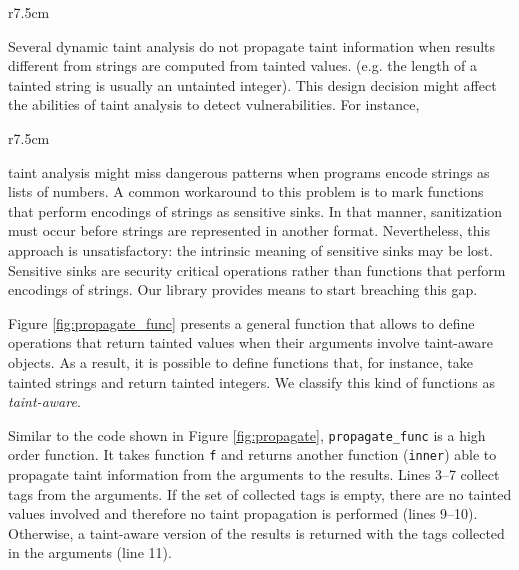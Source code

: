 \begin{wrapfigure}{r}{7.5cm}
\vspace{-30pt}
{\small{

\vspace{-5pt}
\caption{\label{fig:propagate_func} Propagation of taint information among
  possibly different taint-aware objects}
}}
\end{wrapfigure}
Several dynamic taint analysis
\cite{Perl,Nguyen05,Jovanovic06pixy:a,KozlovPetukhov07,Futo07,SeoLam2010}
do not propagate taint information when results 
different from strings are computed from tainted values. 
(e.g. the length of a tainted string is usually an untainted
integer). This design decision might affect the abilities of taint
analysis to detect vulnerabilities. For instance, 
\begin{wrapfigure}{r}{7.5cm}
\vspace{-25pt}
{\small{

\vspace{-5pt}
\caption{\label{fig:propagate_func:example} \nameTklass
  functions for strings and integers}
}}
\vspace{-20pt}
\end{wrapfigure}
taint analysis might miss dangerous patterns when 
programs encode strings as lists of numbers. 
A common workaround to this problem is to 
mark functions that perform
encodings of strings as sensitive sinks. In that manner, 
sanitization must occur before strings are represented in another
format. 
Nevertheless, this approach 
is unsatisfactory: the intrinsic meaning of sensitive sinks may be
lost. Sensitive sinks are security critical operations rather than 
functions that perform encodings of strings.
Our library provides means
to start breaching this gap. 

Figure \ref{fig:propagate_func} presents a general function that allows to define 
operations that return tainted values when their arguments 
involve taint-aware objects. As a result, it is possible
to define functions that, for instance, take tainted strings and 
return tainted integers. We classify this kind of functions 
as \emph{taint-aware}. 

Similar to the code shown in 
Figure \ref{fig:propagate}, \texttt{propagate\_func} is a high order
function. It takes function \texttt{f} 
and returns another function (\texttt{inner}) able to propagate 
taint information from the arguments
to the results.  Lines 3--7 collect tags 
from the arguments. If the set of
collected tags is empty, there are no tainted
values involved and therefore no taint propagation is 
performed (lines 9--10). Otherwise, 
a taint-aware version of the results is returned with 
the tags collected in the arguments (line 11). 
 
